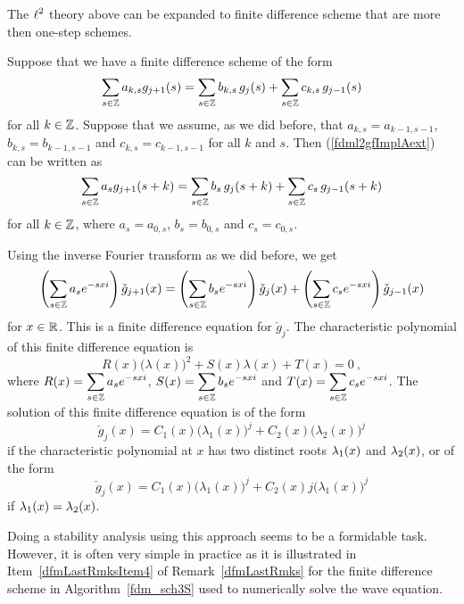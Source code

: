\begin{rmk}
The $\displaystyle \ell^2$ theory above can be expanded to finite
difference scheme that are more then one-step
schemes.   \label{ell2TheoryMsteps}

Suppose that we have a finite difference scheme of the form
\begin{equation} \label{fdml2gfImplAext}
\sum_{s\in \mathbb{Z}} a_{k,s} g_{j+1}(s) = \sum_{s\in \mathbb{Z}} b_{k,s}\, g_j(s)
+ \sum_{s\in \mathbb{Z}} c_{k,s}\, g_{j-1}(s)
\end{equation}
for all $k \in \mathbb{Z}$.  Suppose that we assume, as we did before,
that $a_{k,s} = a_{k-1,s-1}$, $b_{k,s} = b_{k-1,s-1}$ and
$c_{k,s} = c_{k-1,s-1}$ for all $k$ and $s$.  Then
(\ref{fdml2gfImplAext}) can be written as
\begin{equation} \label{fdml2gfImplext}
\sum_{s\in \mathbb{Z}} a_s g_{j+1}(s+k) = \sum_{s\in \mathbb{Z}} b_s\, g_j(s+k)
+ \sum_{s\in \mathbb{Z}} c_s\, g_{j-1}(s+k)
\end{equation}
for all $k\in \mathbb{Z}$, where $a_s = a_{0,s}$, $b_s = b_{0,s}$ and $c_s = c_{0,s}$.

Using the inverse Fourier transform as we did before, we get
\[
\left( \sum_{s\in \mathbb{Z}} a_s e^{-sx i} \right) \check{g}_{j+1}(x)
= \left( \sum_{s\in \mathbb{Z}} b_s e^{-sx i} \right) \check{g}_j(x)
+ \left( \sum_{s\in \mathbb{Z}} c_s e^{-sx i} \right) \check{g}_{j-1}(x)
\]
for $x\in \mathbb{R}$.  This is a finite difference equation for
$\check{g}_j$.  The characteristic polynomial of this finite
difference equation is
\begin{equation}\label{fdml2gfImplBext}
R(x) \big(\lambda(x)\big)^2 + S(x) \lambda(x) + T(x) = 0 \ ,
\end{equation}
where
$\displaystyle R(x) = \sum_{s\in \mathbb{Z}} a_s e^{-sx i}$,
$\displaystyle S(x) = \sum_{s\in \mathbb{Z}} b_s e^{-sx i}$ and
$\displaystyle T(x) = \sum_{s\in \mathbb{Z}} c_s e^{-sx i}$.
The solution of this finite difference equation is of the form
\[
\check{g}_j(x) = C_1(x) \big(\lambda_1(x)\big)^j
+ C_2(x) \big(\lambda_2(x)\big)^j 
\]
if the characteristic polynomial at $x$ has two distinct roots
$\displaystyle \lambda_1(x)$ and $\displaystyle \lambda_2(x)$, or of
the form
\[
\check{g}_j(x) = C_1(x) \big(\lambda_1(x)\big)^j + C_2(x)j
\big(\lambda_1(x)\big)^j 
\]
if $\displaystyle \lambda_1(x) = \lambda_2(x)$.

Doing a stability analysis using this approach seems to be a
formidable task.  However, it is often very simple in practice as
it is illustrated in Item~\ref{dfmLastRmksItem4} of
Remark~\ref{dfmLastRmks} for the finite difference
scheme in Algorithm~\ref{fdm_sch3S} used to numerically solve the wave
equation.
\end{rmk}

